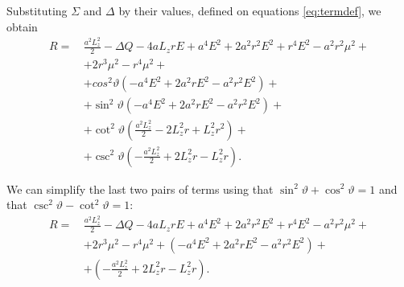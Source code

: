 Substituting $\Sigma$ and $\Delta$ by their values, defined on equations \ref{eq:termdef}, we obtain
\begin{align}
	R =\,& \frac{a^2L_z^2}{2} - \Delta Q - 4aL_zrE + a^4E^2 + 2a^2r^2E^2 + r^4E^2 - a^2r^2\mu^2 + \nonumber \\
	&+ 2r^3\mu^2 - r^4\mu^2 + \nonumber\\
	&+ cos^2\vartheta\left(-a^4E^2 + 2a^2rE^2 - a^2r^2E^2 \right) + \nonumber \\
	&+ \sin^2\vartheta\left( -a^4E^2 + 2a^2rE^2 - a^2r^2E^2 \right) + \nonumber\\
	&+ \cot^2\vartheta\left( \frac{a^2L_z^2}{2} - 2L_z^2r + L_z^2r^2 \right) + \nonumber \\
	&+ \csc^2\vartheta\left( -\frac{a^2L_z^2}{2} + 2L_z^2r - L_z^2r \right).
\end{align}

We can simplify the last two pairs of terms using that $\sin^2 \vartheta + \cos^2 \vartheta = 1$ and that $\csc^2\vartheta - \cot^2\vartheta = 1$:
\begin{align}
	R =\,& \frac{a^2L_z^2}{2} - \Delta Q - 4aL_zrE + a^4E^2 + 2a^2r^2E^2 + r^4E^2 - a^2r^2\mu^2 + \nonumber \\
	&+ 2r^3\mu^2 - r^4\mu^2 + \left(-a^4E^2 + 2a^2rE^2 - a^2r^2E^2 \right) + \nonumber \\
	&+ \left( -\frac{a^2L_z^2}{2} + 2L_z^2r - L_z^2r \right).
\end{align}

